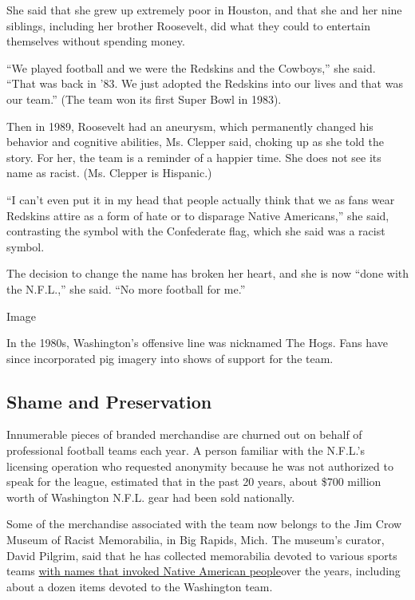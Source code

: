 She said that she grew up extremely poor in Houston, and that she and
her nine siblings, including her brother Roosevelt, did what they could
to entertain themselves without spending money.

``We played football and we were the Redskins and the Cowboys,'' she
said. ``That was back in '83. We just adopted the Redskins into our
lives and that was our team.'' (The team won its first Super Bowl in
1983).

Then in 1989, Roosevelt had an aneurysm, which permanently changed his
behavior and cognitive abilities, Ms. Clepper said, choking up as she
told the story. For her, the team is a reminder of a happier time. She
does not see its name as racist. (Ms. Clepper is Hispanic.)

``I can't even put it in my head that people actually think that we as
fans wear Redskins attire as a form of hate or to disparage Native
Americans,'' she said, contrasting the symbol with the Confederate flag,
which she said was a racist symbol.

The decision to change the name has broken her heart, and she is now
``done with the N.F.L.,'' she said. ``No more football for me.''

Image

In the 1980s, Washington's offensive line was nicknamed The Hogs. Fans
have since incorporated pig imagery into shows of support for the team.~

\hypertarget{shame-and-preservation}{%
\subsection{Shame and Preservation}\label{shame-and-preservation}}

Innumerable pieces of branded merchandise are churned out on behalf of
professional football teams each year. A person familiar with the
N.F.L.'s licensing operation who requested anonymity because he was not
authorized to speak for the league, estimated that in the past 20 years,
about \$700 million worth of Washington N.F.L. gear had been sold
nationally.

Some of the merchandise associated with the team now belongs to the Jim
Crow Museum of Racist Memorabilia, in Big Rapids, Mich. The museum's
curator, David Pilgrim, said that he has collected memorabilia devoted
to various sports teams
\href{https://www.nytimes3xbfgragh.onion/2020/07/14/arts/design/washington-football-logo-native-american.html}{with
names that invoked Native American people}over the years, including
about a dozen items devoted to the Washington team.

